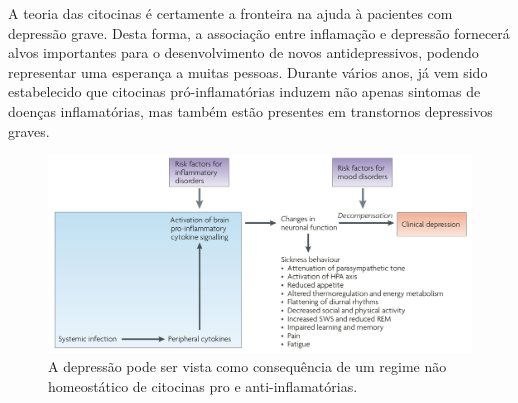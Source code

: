 A teoria das citocinas é certamente a fronteira na ajuda à pacientes com depressão grave. Desta forma, a associação entre inflamação e depressão fornecerá alvos importantes para o desenvolvimento de novos antidepressivos, podendo representar uma esperança a muitas pessoas. Durante vários anos, já vem sido estabelecido que citocinas pró-inflamatórias induzem não apenas sintomas de doenças inflamatórias, mas também estão presentes em transtornos depressivos graves. \cite{Dantzer2008}

\begin{figure}[H]
\centering
\includegraphics[scale=1]{Figuras/homeostase.png}
\caption{A depressão pode ser vista como consequência de um regime não homeostático de citocinas pro e anti-inflamatórias. \cite{Dantzer2008}}
\end{figure}
